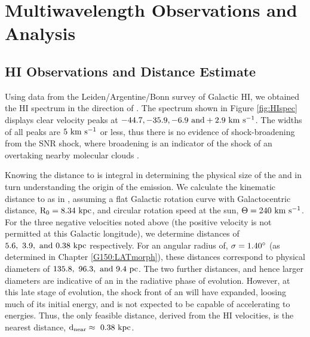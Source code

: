 %
%

\section{Multiwavelength  Observations and  Analysis }\label{G150:Multiwave}
\subsection{HI Observations and Distance Estimate}\label{G150:HI}
Using data from the Leiden/Argentine/Bonn survey of Galactic HI, we obtained the HI spectrum in the direction of \Gone{}. The spectrum shown in Figure \ref{fig:HIspec}  displays clear velocity peaks at ${\rm -44.7, -35.9, -6.9~and +2.9~km~s^{-1}}$. The widths of all peaks are ${\rm 5~km~s^{-1}}$ or less, thus there is no evidence of shock-broadening from the SNR shock, where broadening is an indicator of the shock of an \snr{} overtaking nearby molecular clouds \cite{Wooten77,Wooten81}.

\begin{figure}[!ht]
	\begin{centering}
		\texttt{[image: Figures/\{HIspec]}.png}
		\caption[HI spectrum in the direction of \Gone{}]{\Gone{} HI spectrum. 
			\label{fig:HIspec}}
	\end{centering}
\end{figure}

Knowing the distance to \Gone{} is integral in determining the physical size of the \snr{} and in turn understanding the origin of the \gam{} emission. We calculate the kinematic distance to \Gone{} as in \cite{Reid14}, assuming a flat Galactic rotation curve with Galactocentric distance, ${\rm R_0 =  8.34~kpc}$, and circular rotation speed at the sun, ${\rm \Theta = 240~km~s^{-1}}$. For the three negative velocities noted above (the positive velocity is not permitted at this Galactic longitude), we determine distances of ${\rm 5.6,~3.9,~and~0.38~kpc}$ respectively. For an angular radius of, ${\rm \sigma = 1.40^{\circ}}$ (as determined in Chapter \ref{G150:LATmorph}), these distances correspond to physical diameters of ${\rm 135.8,~96.3,~and~9.4~pc}$. The two further distances, and hence larger diameters are indicative of an \snr{} in the radiative phase of evolution. However, at this late stage of evolution,  the shock front of an \snr{} will have expanded,  loosing much of its initial energy, and is not expected to be capable of accelerating \crs{} to \gam{} energies. Thus, the only feasible distance, derived from the HI velocities, is the nearest distance,  ${\rm d_{near} \approx \ 0.38~kpc}$.

